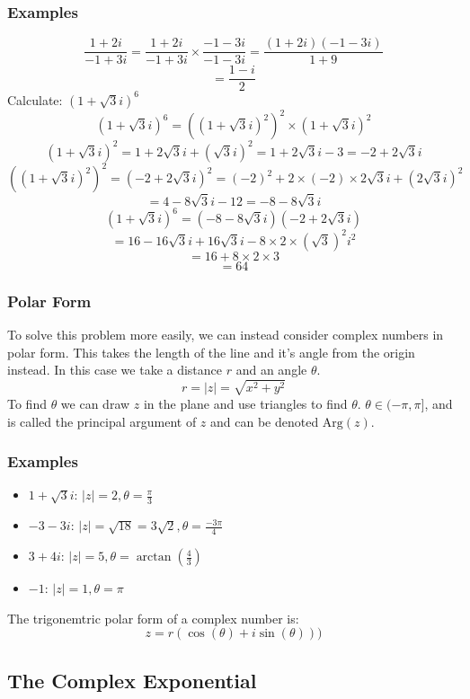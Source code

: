 \documentclass[12pt]{report}
\begin{document}
\begin{flushleft}
\subsubsection*{Examples}
\[\frac{1 + 2i}{-1 + 3i} = \frac{1 + 2i}{-1 + 3i} \times 
\frac{-1 - 3i}{-1 - 3i} = \frac{(1 + 2i)(-1 - 3i)}{1 + 9}\]
\[=\frac{1 - i}{2}\]
Calculate: \((1 + \sqrt{3}i)^6\)
\[(1 + \sqrt{3}i)^6 = ((1 + \sqrt{3}i)^2)^2 \times (1 + \sqrt{3}i)^2\]
\[(1 + \sqrt{3}i)^2 = 1 + 2\sqrt{3}i + (\sqrt{3}i)^2 = 1 + 2\sqrt{3}i - 3 = 
-2 + 2\sqrt{3}i\]
\[((1 + \sqrt{3}i)^2)^2 = (-2 + 2\sqrt{3}i)^2 = (-2)^2 + 2 \times (-2) 
\times 2\sqrt{3}i + (2\sqrt{3}i)^2\]
\[= 4 - 8\sqrt{3}i - 12 = -8 - 8 \sqrt{3}i\]
\[(1 + \sqrt{3}i)^6 = (-8 -8\sqrt{3}i)(-2 + 2\sqrt{3}i)\]
\[= 16 - 16\sqrt{3}i + 16\sqrt{3}i - 8 \times 2 \times (\sqrt{3})^2i^2\]
\[= 16 + 8 \times 2 \times 3\]
\[= 64\]

\subsubsection*{Polar Form}
To solve this problem more easily, we can instead consider complex numbers in
polar form. This takes the length of the line and it's angle from the origin 
instead. In this case we take a distance \(r\) and an angle \(\theta\).
\[r = |z| = \sqrt{x^2 + y^2}\]
To find \(\theta\) we can draw \(z\) in the plane and use triangles to find 
\(\theta\). \(\theta \in (-\pi, \pi]\), and is called the principal argument of
\(z\) and can be denoted \(\mathrm{Arg}(z)\).

\subsubsection*{Examples}
\begin{itemize}
    \item \(1 + \sqrt{3}i\): \(|z| = 2, \theta = \frac{\pi}{3}\)
    \item \(-3 - 3i\): \(|z| = \sqrt{18} = 3\sqrt{2}, \theta = 
    \frac{-3\pi}{4}\)
    \item \(3 + 4i\): \(|z| = 5, \theta = \arctan(\frac{4}{3})\)
    \item \(-1\): \(|z| = 1, \theta = \pi\)
\end{itemize}

The trigonemtric polar form of a complex number is:
\[z = r(\cos(\theta) + i\sin(\theta)))\]

\subsection*{The Complex Exponential}


\end{flushleft}
\end{document}
